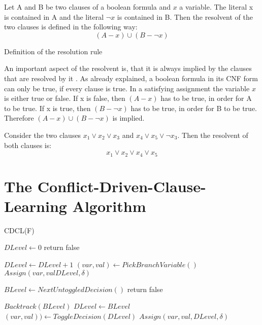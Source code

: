 \begin{definition}
\begin{leftbar}
Let A and B be two clauses of a boolean formula and $x$ a variable. The literal x is contained in A and the literal $\neg x$ is contained in B. Then the resolvent of the two clauses is defined in the following way:
\begin{displaymath}
(A - x) \cup (B - \neg x)
\end{displaymath}
\end{leftbar}
\caption{Definition of the resolution rule \cite{robinson1965machine}}
\label{def:Resolution}
\end{definition}
An important aspect of the resolvent is, that it is always implied by the clauses that are resolved by it \cite{biere2009handbook}. As already explained, a boolean formula in its CNF form can only be true, if every clause is true. In a satisfying assignment the variable $x$ is either true or false. If x is false, then $(A - x)$ has to be true, in order for A to be true. If x is true, then $(B - \neg x)$ has to be true, in order for B to be true. Therefore $(A - x) \cup (B - \neg x)$ is implied.

\begin{leftbar}
Consider the two clauses $x_1 \vee x_2 \vee x_3$ and $x_4 \vee x_5 \vee \neg x_3$. Then the resolvent of both clauses is:
\begin{displaymath}
x_1 \vee x_2 \vee x_4 \vee x_5
\end{displaymath}
\end{leftbar}

\section{The Conflict-Driven-Clause-Learning Algorithm}

\begin{algorithm}
\caption{CDCL(F) \cite{biere2009handbook}}\label{alg:CDCL}
\begin{algorithmic}
\State $DLevel \gets 0$
	\State return false
\EndIf

	\State $DLevel \gets DLevel + 1$
	\State $(var, val) \gets PickBranchVariable()$
	\State $Assign(var, val DLevel, \delta)$
	
		\State $BLevel \gets NextUntoggledDecision()$
			\State return false
		\EndIf
		
		\State $Backtrack(BLevel)$
		\State $DLevel \gets BLevel$
		\State $(var,val)) \gets ToggleDecision(DLevel)$
		\State $Assign(var, val, DLevel, \delta)$
	\EndWhile
\EndWhile
\end{algorithmic}
\end{algorithm}

